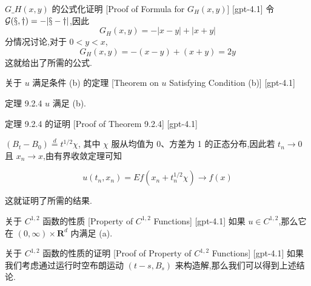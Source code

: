 \documentclass[UTF8]{ctexart}
\begin{document}
    
    
    \begin{prf}
        {$G\_H(x, y)$ 的公式化证明}
        [Proof of Formula for $G_H(x, y)$]
        [gpt-4.1]
        令 $\cal G(x, y) = -|x - y|$,因此
\[
G_H(x, y) = -|x - y| + |x + y|
\]
分情况讨论,对于 $0 < y < x$,
\[
G_H(x, y) = - (x - y) + (x + y) = 2y
\]
这就给出了所需的公式.
    \end{prf}
    
    
    
    \begin{thm}
        {关于 $
    u$ 满足条件 (b) 的定理}
        [Theorem on $
    u$ Satisfying Condition (b)]
        [gpt-4.1]
        
定理 9.2.4 $
u$ 满足 (b).

    \end{thm}
    
    
    
    \begin{prf}
        {定理 9.2.4 的证明}
        [Proof of Theorem 9.2.4]
        [gpt-4.1]
        
$(B_{t} - B_{0}) \stackrel{d}{=} t^{1/2} \chi$, 其中 $\chi$ 服从均值为 0、方差为 1 的正态分布,因此若 $t_{n} \to 0$ 且 $x_{n} \to x$,由有界收敛定理可知

\[
u(t_{n}, x_{n}) = E f(x_{n} + t_{n}^{1/2} \chi) \to f(x)
\]

这就证明了所需的结果.

    \end{prf}
    
    
    
    \begin{thm}
        {关于 $C^{1,2}$ 函数的性质}
        [Property of $C^{1,2}$ Functions]
        [gpt-4.1]
        如果 $
u \in C^{1,2}$,那么它在 $(0, \infty) \times \mathbf{R}^{d}$ 内满足 (a).
    \end{thm}
    
    
    
    \begin{prf}
        {关于 $C^{1,2}$ 函数的性质的证明}
        [Proof of Property of $C^{1,2}$ Functions]
        [gpt-4.1]
        如果我们考虑通过运行时空布朗运动 $(t-s, B_{s})$ 来构造解,那么我们可以得到上述结论.
    \end{prf}
    
\end{document}
